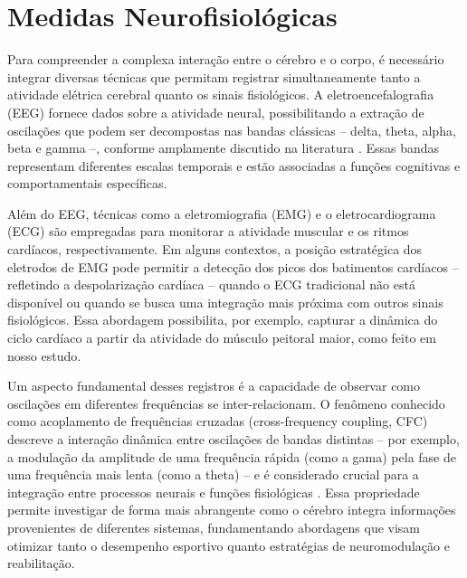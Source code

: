 \section{Medidas Neurofisiológicas}

Para compreender a complexa interação entre o cérebro e o corpo, é necessário integrar diversas técnicas que permitam registrar simultaneamente tanto a atividade elétrica cerebral quanto os sinais fisiológicos. A eletroencefalografia (EEG) fornece dados sobre a atividade neural, possibilitando a extração de oscilações que podem ser decompostas nas bandas clássicas – delta, theta, alpha, beta e gamma –, conforme amplamente discutido na literatura \cite{cohen2017where, bullmore2009complex}. Essas bandas representam diferentes escalas temporais e estão associadas a funções cognitivas e comportamentais específicas.

Além do EEG, técnicas como a eletromiografia (EMG) e o eletrocardiograma (ECG) são empregadas para monitorar a atividade muscular e os ritmos cardíacos, respectivamente. Em alguns contextos, a posição estratégica dos eletrodos de EMG pode permitir a detecção dos picos dos batimentos cardíacos – refletindo a despolarização cardíaca – quando o ECG tradicional não está disponível ou quando se busca uma integração mais próxima com outros sinais fisiológicos. Essa abordagem possibilita, por exemplo, capturar a dinâmica do ciclo cardíaco a partir da atividade do músculo peitoral maior, como feito em nosso estudo.

Um aspecto fundamental desses registros é a capacidade de observar como oscilações em diferentes frequências se inter-relacionam. O fenômeno conhecido como acoplamento de frequências cruzadas (cross-frequency coupling, CFC) descreve a interação dinâmica entre oscilações de bandas distintas – por exemplo, a modulação da amplitude de uma frequência rápida (como a gama) pela fase de uma frequência mais lenta (como a theta) – e é considerado crucial para a integração entre processos neurais e funções fisiológicas \cite{criscuolo2022cognition, cohen2017where}. Essa propriedade permite investigar de forma mais abrangente como o cérebro integra informações provenientes de diferentes sistemas, fundamentando abordagens que visam otimizar tanto o desempenho esportivo quanto estratégias de neuromodulação e reabilitação.